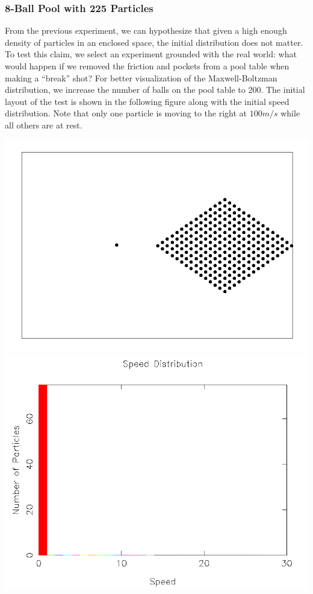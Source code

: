 \documentclass{article}
\begin{document}
\subsubsection{8-Ball Pool with 225 Particles}
From the previous experiment, we can hypothesize that given a high enough density of particles in an enclosed space,
the initial distribution does not matter. To test this claim, we select an experiment grounded with the real world:
what would happen if we removed the friction and pockets from a pool table when making a ``break'' shot?
For better visualization of the Maxwell-Boltzman distribution, we increase the number of balls on the pool table to 200.
The initial layout of the test is shown in the following figure along with the initial speed distribution.
Note that only one particle is moving to the right at $100 m/s$ while all others are at rest.
\\
\begin{center}
    \includegraphics[scale=0.5]{uncharged_pool}
    \includegraphics[scale=0.5]{uncharged_pool_dist}
\end{center}
\end{document}
